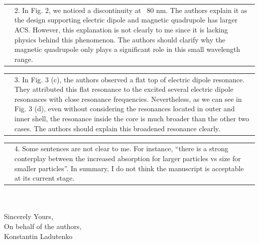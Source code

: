\documentclass[a4paper]{article}
\begin{document}

\begin{tabular}[!H]{l|p{}}
  \quad &  2.      In Fig. 2, we noticed a discontinuity at ~80
  nm. The authors explain it as the design supporting electric dipole
  and magnetic quadrupole has larger ACS. However, this explanation is
  not clearly to me since it is lacking physics behind this
  phenomenon. The authors should clarify why the magnetic quadrupole
  only plays a significant role in this small wavelength range. 
\end{tabular}



\begin{tabular}[!H]{l|p{}}
\quad & 3.      In Fig. 3 (c), the authors observed a flat top of
electric dipole resonance. They attributed this flat resonance to the
excited several electric dipole resonances with close resonance
frequencies. Nevertheless, as we can see in Fig. 3 (d), even without
considering the resonances located in outer and inner shell, the
resonance inside the core is much broader than the other two
cases. The authors should explain this broadened resonance clearly. 
\end{tabular}


\begin{tabular}[!H]{l|p{}}
\quad & 4.      Some sentences are not clear to me. For instance,
“there is a strong conterplay between the increased absorption for
larger particles vs size for smaller particles”. 
In summary, I do not think the manuscript is acceptable at its current
stage. 
\end{tabular}%
\\
\vspace{10pt}
\\
Sincerely Yours,\\
On behalf of the authors,\\
Konstantin Ladutenko
\end{document}
